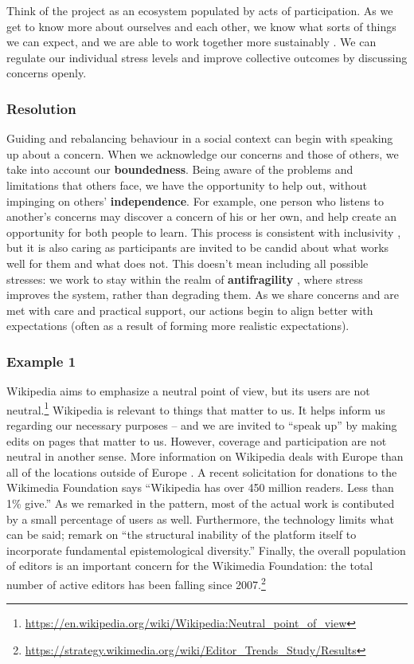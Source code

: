 Think of the project as an ecosystem populated by acts of participation.  As we get to know more about ourselves and each other, we know what sorts of things we can expect, and we are able to work together more sustainably \cite{ostrom2010revising}.
%
We can regulate our individual stress levels and improve collective outcomes by discussing concerns openly.

\subsubsection*{Resolution}

Guiding and rebalancing behaviour in a social context can begin with speaking up about a concern.  When we acknowledge our concerns and those of others, we take into account our \textbf{boundedness}.  Being aware of the problems and limitations that others face, we have the opportunity to help out, without impinging on others' \textbf{independence}.  For example, one person who listens to another's concerns may discover a concern of his or her own, and help create an opportunity for both people to learn.  This process is  consistent with inclusivity \cite{garrison2013toward}, but it is also caring as participants are invited to be candid about what works well for them and what does not.  This doesn't mean including all possible stresses: we work to stay within the realm of \textbf{antifragility} \cite{taleb2012antifragile}, where stress improves the system, rather than degrading them. 
%
As we share concerns and are met with care and practical support, our actions begin to align better with expectations (often as a result of forming more realistic expectations). 

\subsubsection*{Example 1}
Wikipedia aims to emphasize a neutral point of view, but its users are
not neutral.\footnote{\url{https://en.wikipedia.org/wiki/Wikipedia:Neutral_point_of_view}}
Wikipedia is relevant to things that matter to us.  It
helps inform us regarding our necessary purposes -- and we are invited
to ``speak up'' by making edits on pages that matter to us.  However,
coverage and participation are not neutral in another sense.
More information on Wikipedia deals with Europe than
all of the locations outside of Europe \citep{graham2014uneven}.
A recent solicitation for donations to the Wikimedia Foundation
says ``Wikipedia has over 450 million readers.  Less than 1\% give.''
%
As we remarked in the  pattern, most of the
actual work is contibuted by a small percentage of users as well.
%
Furthermore, the technology limits what can be said; 
\cite{graham2014uneven} remark on
``the structural inability of the platform itself to incorporate fundamental epistemological diversity.''
%
Finally, the overall population of editors is an important concern for
the Wikimedia Foundation: the total number of active editors has been
falling since
2007.\footnote{\url{https://strategy.wikimedia.org/wiki/Editor_Trends_Study/Results}}

